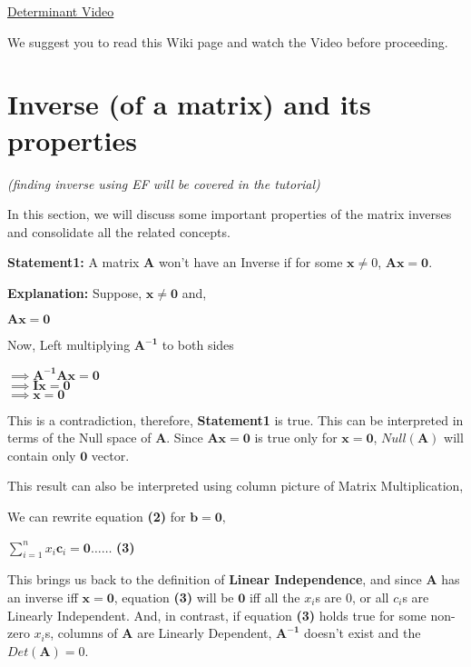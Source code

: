 \documentclass[a4paper]{article}
\begin{document}
\href{https://www.youtube.com/watch?v=Ip3X9LOh2dk}{Determinant Video}

We suggest you to read this Wiki page and watch the Video before proceeding.


\newpage
\section{Inverse (of a matrix) and its properties}
\textit{(finding inverse using EF will be covered in the tutorial)}

In this section, we will discuss some important properties of the matrix inverses and consolidate all the related concepts.

\textbf{Statement1: } A matrix \textbf{A} won't have an Inverse if for some $\mathbf{x}\neq0$, $\mathbf{Ax} = \mathbf{0}$.

\textbf{Explanation: } Suppose, $\mathbf{x}\neq\mathbf{0}$ and, 
\begin{center}
    $\mathbf{Ax} = \mathbf{0}$    
\end{center}
Now, Left multiplying $\mathbf{A^{-1}}$ to both sides

\begin{center}
    $\implies \mathbf{A^{-1}Ax} = \mathbf{0}$\\
    $\implies \mathbf{Ix} = \mathbf{0}$\\
    $\implies \mathbf{x} = \mathbf{0}$
\end{center}
This is a contradiction, therefore, \textbf{Statement1} is true. This can be interpreted in terms of the Null space of $\mathbf{A}$. Since $\mathbf{Ax} = \mathbf{0}$ is true only for $\mathbf{x} = \mathbf{0}$, $Null(\mathbf{A})$  will contain only $\mathbf{0}$ vector.

This result can also be interpreted using column picture of Matrix Multiplication,

We can rewrite equation \textbf{(2)} for $\mathbf{b} = \mathbf{0},$
\begin{center}
    $
    \displaystyle\sum_{i=1}^{n}x_i\textbf{c}_i = \textbf{0} \dots\dots
    $
    \textbf{(3)}
\end{center}

This brings us back to the definition of \textbf{Linear Independence}, and since $\mathbf{A}$ has an inverse iff $\mathbf{x} = \mathbf{0}$, equation \textbf{(3)} will be $\mathbf{0}$ iff all the $x_i$s are $0$, or all $c_i$s are Linearly Independent. And, in contrast, if equation \textbf{(3)} holds true for some non-zero $x_i$s, columns of $\mathbf{A}$ are Linearly Dependent, $\mathbf{A^{-1}}$ doesn't exist and the $Det(\mathbf{A}) = 0$.
\end{document}
